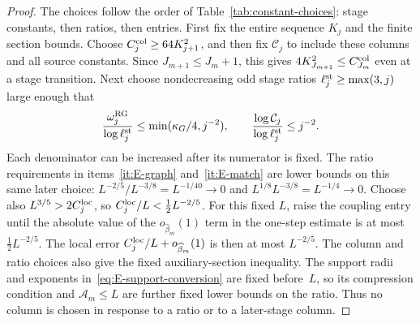 \begin{proof}
The choices follow the order of Table~\ref{tab:constant-choices}: stage constants, then ratios, then entries. First fix the entire sequence $K_j$ and the finite section bounds. Choose $C^{\rm col}_j\ge64K_{j+1}^2$, and then fix $\mathcal C_j$ to include these columns and all source constants. Since $J_{m+1}\le J_m+1$, this gives $4K_{J_{m+1}}^2\le C^{\rm col}_{J_m}$ even at a stage transition. Next choose nondecreasing odd stage ratios $\ell_j^{\rm st}\ge\max(3,j)$ large enough that
\begin{equation}\label{eq:E-log-cost}
\frac{\omega_j^{\rm RG}}{\log\ell_j^{\rm st}}
\le\min(\kappa_G/4,j^{-2}),\qquad
\frac{\log\mathcal C_j}{\log\ell_j^{\rm st}}\le j^{-2}.
\end{equation}
Each denominator can be increased after its numerator is fixed. The ratio requirements in items~\ref{it:E-graph} and~\ref{it:E-match} are lower bounds on this same later choice: $L^{-2/5}/L^{-3/8}=L^{-1/40}\to0$ and $L^{1/8}L^{-3/8}=L^{-1/4}\to0$. Choose also $L^{3/5}>2C_j^{\rm loc}$, so $C_j^{\rm loc}/L<\tfrac12L^{-2/5}$. For this fixed $L$, raise the coupling entry until the absolute value of the $o_{\widehat\beta_m}(1)$ term in the one-step estimate is at most $\tfrac12L^{-2/5}$. The local error $C_j^{\rm loc}/L+o_{\widehat\beta_m}(1)$ is then at most $L^{-2/5}$. The column and ratio choices also give the fixed auxiliary-section inequality. The support radii and exponents in~\eqref{eq:E-support-conversion} are fixed before~$L$, so its compression condition and $\mathcal A_m\le L$ are further fixed lower bounds on the ratio. Thus no column is chosen in response to a ratio or to a later-stage column.


\end{proof}
